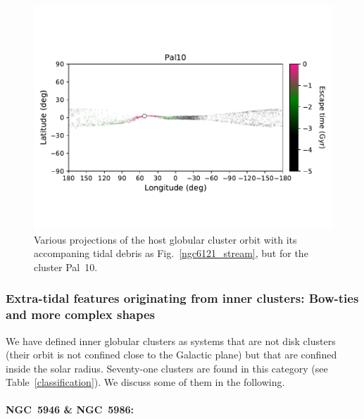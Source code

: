 \begin{figure}
                \includegraphics[clip=true, trim = 0mm 20mm 0mm 10mm, width=0.9\columnwidth]{images/PII_individual_Pal10_Pal10_LB_tesc.pdf}
                \caption[]{Various projections of the host globular cluster orbit with its accompaning tidal debris as Fig.~\ref{ngc6121_stream}, but for the cluster Pal~10. \label{pal10_stream}}
            \end{figure}
            \onecolumn  
            
        \subsubsection{Extra-tidal features originating from inner clusters: Bow-ties and more complex shapes}

            We have defined inner globular clusters as systems that are not disk clusters (their orbit is not confined close to the Galactic plane) but that are confined inside the solar radius. Seventy-one clusters are found in this category (see  Table~\ref{classification}). We discuss some of them in the following.

            \paragraph{NGC~5946 \& NGC~5986:}

